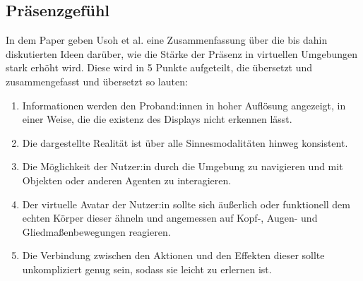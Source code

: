         \subsection{Präsenzgefühl}
            In dem Paper \cite{presence-questionaire} geben Usoh et al. eine Zusammenfassung über die bis dahin diskutierten Ideen darüber, wie die Stärke der Präsenz in virtuellen Umgebungen stark erhöht wird. Diese wird in 5 Punkte aufgeteilt, die übersetzt und zusammengefasst und übersetzt so lauten:

            \begin{enumerate}
                \item Informationen werden den Proband:innen in hoher Auflösung angezeigt, in einer Weise, die die existenz des Displays nicht erkennen lässt.

                \item Die dargestellte Realität ist über alle Sinnesmodalitäten hinweg konsistent.

                \item  Die Möglichkeit der Nutzer:in durch die Umgebung zu navigieren und mit Objekten oder anderen Agenten zu interagieren.

                \item Der virtuelle Avatar der Nutzer:in sollte sich äußerlich oder funktionell dem echten Körper dieser ähneln und angemessen auf Kopf-, Augen- und Gliedmaßenbewegungen reagieren.

                \item Die Verbindung zwischen den Aktionen und den Effekten dieser sollte unkompliziert genug sein, sodass sie leicht zu erlernen ist.
            \end{enumerate}

